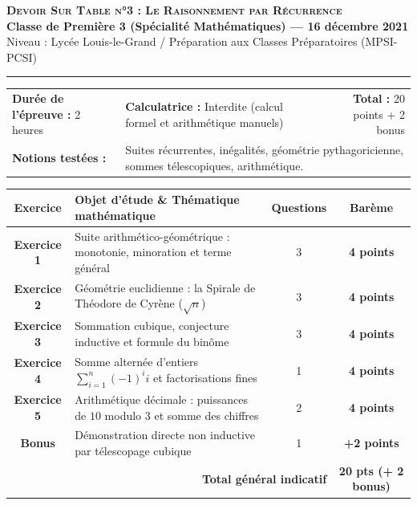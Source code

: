 \documentclass[11pt,a4paper]{article}
\begin{document}
\begin{center}
  {\fontsize{17}{21}\selectfont\textbf{\textsc{Devoir Sur Table n°3 : Le Raisonnement par Récurrence}}}\\[4pt]
  {\large\sffamily\textbf{Classe de Première 3 (Spécialité Mathématiques) --- 16 décembre 2021}}\\[2pt]
  {\small\sffamily Niveau : Lycée Louis-le-Grand / Préparation aux Classes Préparatoires (MPSI-PCSI)}\\[6pt]
  \rule{0.9\textwidth}{0.8pt}
\end{center}

\vspace{-0.3cm}

\begin{tcolorbox}[enhanced, colback=white, colframe=linegray, boxrule=0.6pt, arc=1mm]
\begin{tabularx}{\textwidth}{lXr}
  \textbf{Durée de l'épreuve :} 2 heures & \textbf{Calculatrice :} Interdite (calcul formel et arithmétique manuels) & \textbf{Total :} 20 points + 2 bonus \\
  \textbf{Notions testées :} & \multicolumn{2}{l}{Suites récurrentes, inégalités, géométrie pythagoricienne, sommes télescopiques, arithmétique.}
\end{tabularx}
\end{tcolorbox}

\vspace{0.1cm}

\begin{center}
\renewcommand{\arraystretch}{1.2}
\small
\begin{tabularx}{\textwidth}{|c|X|c|c|}
\hline
\textbf{Exercice} & \textbf{Objet d'étude \& Thématique mathématique} & \textbf{Questions} & \textbf{Barème} \\
\hline
\textbf{Exercice 1} & Suite arithmético-géométrique : monotonie, minoration et terme général & 3 & \textbf{4 points} \\
\hline
\textbf{Exercice 2} & Géométrie euclidienne : la Spirale de Théodore de Cyrène ($\sqrt{n}$) & 3 & \textbf{4 points} \\
\hline
\textbf{Exercice 3} & Sommation cubique, conjecture inductive et formule du binôme & 3 & \textbf{4 points} \\
\hline
\textbf{Exercice 4} & Somme alternée d'entiers $\sum_{i=1}^n (-1)^i i$ et factorisations fines & 1 & \textbf{4 points} \\
\hline
\textbf{Exercice 5} & Arithmétique décimale : puissances de $10$ modulo $3$ et somme des chiffres & 2 & \textbf{4 points} \\
\hline
\textbf{Bonus} & Démonstration directe non inductive par télescopage cubique & 1 & \textbf{+2 points} \\
\hline
\multicolumn{3}{|r|}{\textbf{Total général indicatif}} & \textbf{20 pts (+ 2 bonus)} \\
\hline
\end{tabularx}
\end{center}
\end{document}
